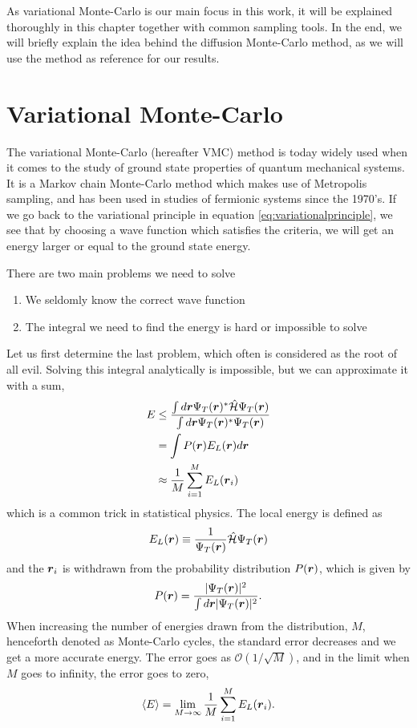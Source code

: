 As variational Monte-Carlo is our main focus in this work, it will be explained thoroughly in this chapter together with common sampling tools. In the end, we will briefly explain the idea behind the diffusion Monte-Carlo method, as we will use the method as reference for our results. 

\section{Variational Monte-Carlo} \label{subsec:vmc}
The variational Monte-Carlo (hereafter VMC) method is today widely used when it comes to the study of ground state properties of quantum mechanical systems. It is a Markov chain Monte-Carlo method which makes use of Metropolis sampling, and has been used in studies of fermionic systems since the 1970's. \cite{deb_variational_2014} If we go back to the variational principle in equation \eqref{eq:variationalprinciple}, we see that by choosing a wave function which satisfies the criteria, we will get an energy larger or equal to the ground state energy. \bigskip

There are two main problems we need to solve
\begin{enumerate}
	\item We seldomly know the correct wave function
	\item The integral we need to find the energy is hard or impossible to solve
\end{enumerate}
Let us first determine the last problem, which often is considered as the root of all evil. Solving this integral analytically is impossible, but we can approximate it with a sum,
\begin{align}
E &\leq \frac{\int d\boldsymbol{{r}}\Psi_T(\boldsymbol{{r}})^*\hat{\mathcal{H}}\Psi_T(\boldsymbol{{r}})}{\int d\boldsymbol{{r}}\Psi_T(\boldsymbol{{r}})^*\Psi_T(\boldsymbol{{r}})} \notag\\
& = \int P(\boldsymbol{{r}}) E_L(\boldsymbol{{r}}) d\boldsymbol{{r}} \notag\\
& \approx \frac{1}{M}\sum_{i=1}^ME_L(\boldsymbol{{r}}_i) \label{eq:energysum}
\end{align}
which is a common trick in statistical physics. The local energy is defined as
\begin{equation}
E_L(\boldsymbol{{r}})\equiv\frac{1}{\Psi_T(\boldsymbol{{r}})}\hat{\mathcal{H}}\Psi_T(\boldsymbol{{r}})
\label{eq:local energy}
\end{equation}
and the $\boldsymbol{{r}}_i$ is withdrawn from the probability distribution $P(\boldsymbol{{r}})$, which is given by
\begin{equation}
P(\boldsymbol{{r}})=\frac{|\Psi_T(\boldsymbol{{r}})|^2}{\int d\boldsymbol{{r}}|\Psi_T(\boldsymbol{{r}})|^2}.
\label{eq:probvmc}
\end{equation}
When increasing the number of energies drawn from the distribution, $M$, henceforth denoted as Monte-Carlo cycles, the standard error decreases and we get a more accurate energy. The error goes as $\mathcal{O}(1/\sqrt{M})$, and in the limit when $M$ goes to infinity, the error goes to zero,
\begin{equation}
\langle E\rangle=\lim_{M\to\infty} \frac{1}{M}\sum_{i=1}^ME_L(\boldsymbol{{r}}_i).
\end{equation}

